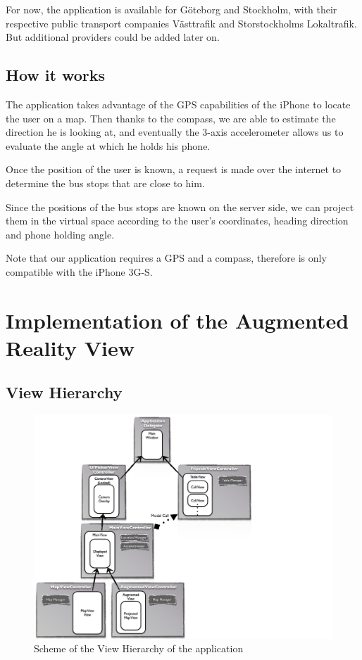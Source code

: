 For now, the application is available for Göteborg and Stockholm, with their respective public transport companies Västtrafik and Storstockholms Lokaltrafik. But additional providers could be added later on.

\subsection{How it works}

The application takes advantage of the GPS capabilities of the iPhone to locate the user on a map. Then thanks to the compass, we are able to estimate the direction he is looking at, and eventually the 3-axis accelerometer allows us to evaluate the angle at which he holds his phone.

Once the position of the user is known, a request is made over the internet to determine the bus stops that are close to him.

Since the positions of the bus stops are known on the server side, we can project them in the virtual space according to the user's coordinates, heading direction and phone holding angle.

Note that our application requires a GPS and a compass, therefore is only compatible with the iPhone 3G-S.

\section{Implementation of the Augmented Reality View}
\label{sec:implementation_of_ar_view}

\subsection{View Hierarchy}

\begin{figure}[ht]
\center
\includegraphics[scale=0.5]{pics/client_view_hierarchy}
\caption{Scheme of the View Hierarchy of the application}
\label{fig:client_view_hierarchy}
\end{figure}

